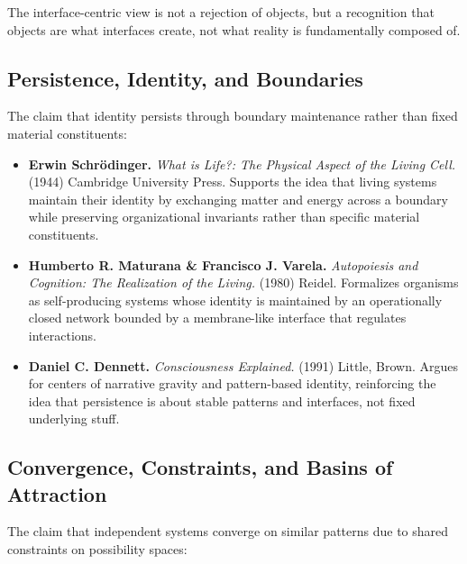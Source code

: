 \documentclass[
  openright]{book}
\begin{document}
The interface-centric view is not a rejection of objects, but a
recognition that objects are what interfaces create, not what reality is
fundamentally composed of.

\subsection{Persistence, Identity, and
Boundaries}\label{persistence-identity-and-boundaries}

The claim that identity persists through boundary maintenance rather
than fixed material constituents:

\begin{itemize}
\item
  \textbf{Erwin Schrödinger.} \emph{What is Life?: The Physical Aspect
  of the Living Cell.} (1944) Cambridge University Press. Supports the
  idea that living systems maintain their identity by exchanging matter
  and energy across a boundary while preserving organizational
  invariants rather than specific material constituents.
\item
  \textbf{Humberto R. Maturana \& Francisco J. Varela.}
  \emph{Autopoiesis and Cognition: The Realization of the Living.}
  (1980) Reidel. Formalizes organisms as self-producing systems whose
  identity is maintained by an operationally closed network bounded by a
  membrane-like interface that regulates interactions.
\item
  \textbf{Daniel C. Dennett.} \emph{Consciousness Explained.} (1991)
  Little, Brown. Argues for centers of narrative gravity and
  pattern-based identity, reinforcing the idea that persistence is about
  stable patterns and interfaces, not fixed underlying stuff.
\end{itemize}

\subsection{Convergence, Constraints, and Basins of
Attraction}\label{convergence-constraints-and-basins-of-attraction}

The claim that independent systems converge on similar patterns due to
shared constraints on possibility spaces:
\end{document}
